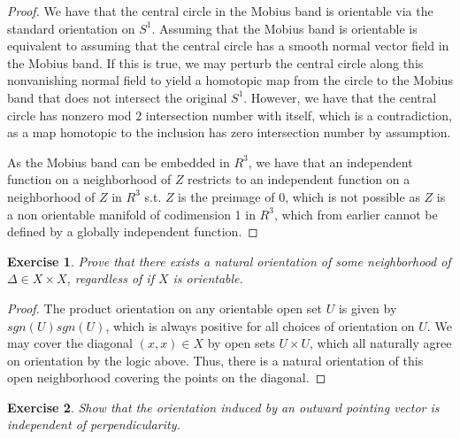 \documentclass{article}
\newtheorem{exercise}{Exercise}
\begin{document}
\begin{proof}
  We have that the central circle in the Mobius band is orientable via the standard orientation on $S^{1}$. Assuming that the Mobius band is orientable is equivalent to assuming that the central circle has a smooth normal vector field in the Mobius band. If this is true, we may perturb the central circle along this nonvanishing normal field to yield a homotopic map from the circle to the Mobius band that does not intersect the original $S^{1}$. However, we have that the central circle has nonzero mod 2 intersection number with itself, which is a contradiction, as a map homotopic to the inclusion has zero intersection number by assumption. \newline

  As the Mobius band can be embedded in $R^{3}$, we have that an independent function on a neighborhood of $Z$ restricts to an independent function on a neighborhood of $Z$ in $R^{3}$ s.t. $Z$ is the preimage of 0, which is not possible as $Z$ is a non orientable manifold of codimension 1 in $R^{3}$, which from earlier cannot be defined by a globally independent function. 
\end{proof}

\begin{exercise}
  Prove that there exists a natural orientation of some neighborhood of $\Delta \in X \times X$, regardless of if $X$ is orientable. 
\end{exercise}

\begin{proof}
  The product orientation on any orientable open set $U$ is given by $sgn(U)sgn(U)$, which is always positive for all choices of orientation on $U$. We may cover the diagonal $(x,x) \in X$ by open sets $U \times U$, which all naturally agree on orientation by the logic above. Thus, there is a natural orientation of this open neighborhood covering the points on the diagonal. 
\end{proof}

\begin{exercise}
Show that the orientation induced by an outward pointing vector is independent of perpendicularity.   
\end{exercise}
\end{document}

